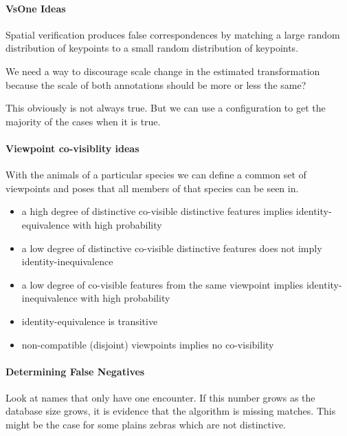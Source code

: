 \paragraph{VsOne Ideas}

Spatial verification produces false correspondences by matching a large random distribution of keypoints 
to a small random distribution of keypoints. 

We need a way to discourage scale change in the estimated transformation because the
scale of both annotations should be more or less the same? 

This obviously is not always true.
But we can use a configuration to get the majority of the cases when it is
  true.

\paragraph{Viewpoint co-visiblity ideas}
    With the animals of a particular species we can define a common set of
      viewpoints and poses that all members of that species can be seen in.
    \begin{itemize}
        \item a high degree of distinctive co-visible distinctive features implies identity-equivalence with high probability
        \item a low degree of distinctive co-visible distinctive features does not imply identity-inequivalence 
        \item a low degree of co-visible features from the same viewpoint implies identity-inequivalence with high probability
        \item identity-equivalence is transitive
        \item non-compatible (disjoint) viewpoints implies no co-visibility
    \end{itemize}


\paragraph{Determining False Negatives}
Look at names that only have one encounter.
If this number grows as the database size grows, it is evidence that the
  algorithm is missing matches.
This might be the case for some plains zebras which are not distinctive.


